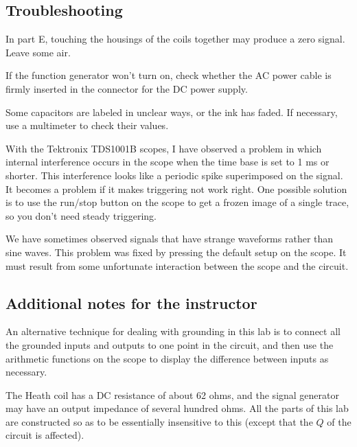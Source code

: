 \subsection*{Troubleshooting}

In part E, touching the housings of the coils together may produce a zero signal. Leave some air.

If the function generator won't turn on, check whether the AC power cable is firmly inserted in
the connector for the DC power supply.

Some capacitors are labeled in unclear ways, or the ink has faded. If necessary, use a multimeter
to check their values.

With the Tektronix TDS1001B scopes, I have observed a problem
in which internal interference occurs in the scope when the
time base is set to 1 ms or shorter. This interference looks like
a periodic spike superimposed on the signal. It becomes a problem
if it makes triggering not work right. One possible solution is
to use the run/stop button on the scope to get a frozen image of a single trace,
so you don't need steady triggering.

We have sometimes observed signals that have strange waveforms rather than sine waves.
This problem was fixed by pressing the default setup on the scope. It must result from
some unfortunate interaction between the scope and the circuit.

\subsection*{Additional notes for the instructor}

An alternative technique for dealing with grounding in this lab is to connect all the grounded
inputs and outputs to one point in the circuit, and then use the arithmetic functions on the
scope to display the difference between inputs as necessary.

The Heath coil has a DC resistance of about 62 ohms, and the signal generator
may have an output impedance of several hundred ohms. All the parts of this lab
are constructed so as to be essentially insensitive to this (except that the $Q$ of
the circuit is affected).
